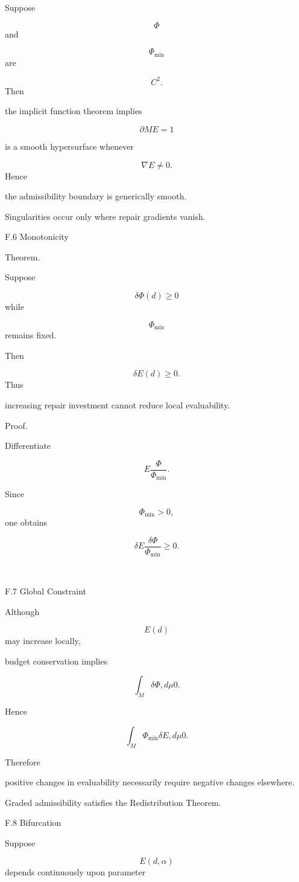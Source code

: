 \documentclass[12pt,oneside]{article}
\theoremstyle{plain}
\theoremstyle{definition}
\theoremstyle{remark}
\begin{document}
Suppose

\[
\Phi
\]
and

\[
\Phi_{\min}
\]
are

\[
C^2.
\]
Then

the implicit function theorem implies

\[
\partial M
{
E=1
}
\]

is a smooth hypersurface whenever

\[
\nabla E
\neq0.
\]
Hence

the admissibility boundary is generically smooth.

Singularities occur only where repair gradients vanish.


F.6 Monotonicity

Theorem.

Suppose

\[
\delta\Phi(d)\ge0
\]
while

\[
\Phi_{\min}
\]
remains fixed.

Then

\[
\delta E(d)\ge0.
\]
Thus

increasing repair investment cannot reduce local evaluability.

Proof.

Differentiate

\[
E
\frac{\Phi}{\Phi_{\min}}.
\]

Since

\[
\Phi_{\min}>0,
\]
one obtains

\[
\delta E
\frac{\delta\Phi}
{\Phi_{\min}}
\ge0.
\]

\square


F.7 Global Constraint

Although

\[
E(d)
\]
may increase locally,

budget conservation implies

\[
\int_M
\delta\Phi
,d\mu
0. 

\]

Hence

\[
\int_M
\Phi_{\min}
\delta E
,d\mu
0. 

\]

Therefore

positive changes in evaluability necessarily require negative changes elsewhere.

Graded admissibility satisfies the Redistribution Theorem.


F.8 Bifurcation

Suppose

\[
E(d,\alpha)
\]
depends continuously upon parameter
\end{document}
